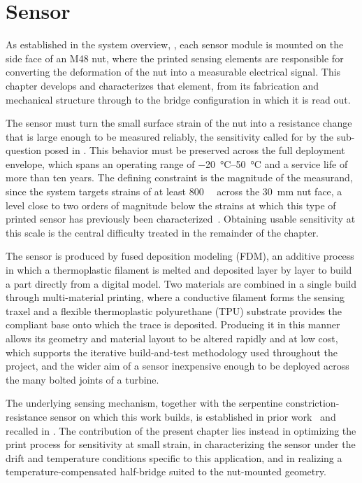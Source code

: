\chapter{Sensor} \label{sec:Sensor}
As established in the system overview, , each sensor module is mounted on the side face of an M48 nut, where the printed sensing elements are responsible for converting the deformation of the nut into a measurable electrical signal. This chapter develops and characterizes that element, from its fabrication and mechanical structure through to the bridge configuration in which it is read out.

The sensor must turn the small surface strain of the nut into a resistance change that is large enough to be measured reliably, the sensitivity called for by the sub-question posed in . This behavior must be preserved across the full deployment envelope, which spans an operating range of \SIrange{-20}{50}{\celsius} and a service life of more than ten years. The defining constraint is the magnitude of the measurand, since the system targets strains of at least \SI{800}{\micro\strain} across the \SI{30}{\milli\meter} nut face, a level close to two orders of magnitude below the strains at which this type of printed sensor has previously been characterized~\cite{G.O.A.T}. Obtaining usable sensitivity at this scale is the central difficulty treated in the remainder of the chapter.

The sensor is produced by fused deposition modeling (FDM), an additive process in which a thermoplastic filament is melted and deposited layer by layer to build a part directly from a digital model. Two materials are combined in a single build through multi-material printing, where a conductive filament forms the sensing traxel and a flexible thermoplastic polyurethane (TPU) substrate provides the compliant base onto which the trace is deposited. Producing it in this manner allows its geometry and material layout to be altered rapidly and at low cost, which supports the iterative build-and-test methodology used throughout the project, and the wider aim of a sensor inexpensive enough to be deployed across the many bolted joints of a turbine.
 
The underlying sensing mechanism, together with the serpentine constriction-resistance sensor on which this work builds, is established in prior work~\cite{G.O.A.T} and recalled in . The contribution of the present chapter lies instead in optimizing the print process for sensitivity at small strain, in characterizing the sensor under the drift and temperature conditions specific to this application, and in realizing a temperature-compensated half-bridge suited to the nut-mounted geometry.

